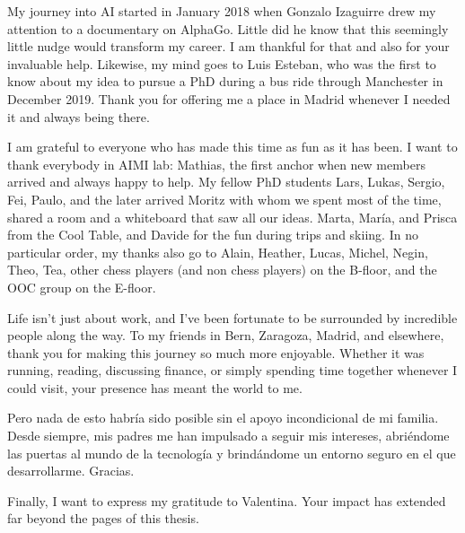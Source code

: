 My journey into AI started in January 2018 when Gonzalo Izaguirre drew my attention to a documentary on AlphaGo. Little did he know that this seemingly little nudge would transform my career. I am thankful for that and also for your invaluable help. Likewise, my mind goes to Luis Esteban, who was the first to know about my idea to pursue a PhD during a bus ride through Manchester in December 2019. Thank you for offering me a place in Madrid whenever I needed it and always being there.

I am grateful to everyone who has made this time as fun as it has been. I want to thank everybody in AIMI lab: Mathias, the first anchor when new members arrived and always happy to help. My fellow PhD students Lars, Lukas, Sergio, Fei, Paulo, and the later arrived Moritz with whom we spent most of the time, shared a room and a whiteboard that saw all our ideas. Marta, María, and Prisca from the Cool Table, and Davide for the fun during trips and skiing. In no particular order, my thanks also go to Alain, Heather, Lucas, Michel, Negin, Theo, Tea, other chess players (and non chess players) on the B-floor, and the OOC group on the E-floor.

Life isn’t just about work, and I’ve been fortunate to be surrounded by incredible people along the way. To my friends in Bern, Zaragoza, Madrid, and elsewhere, thank you for making this journey so much more enjoyable. Whether it was running, reading, discussing finance, or simply spending time together whenever I could visit, your presence has meant the world to me.

Pero nada de esto habría sido posible sin el apoyo incondicional de mi familia. Desde siempre, mis padres me han impulsado a seguir mis intereses, abriéndome las puertas al mundo de la tecnología y brindándome un entorno seguro en el que desarrollarme. Gracias. 

Finally, I want to express my gratitude to Valentina. Your impact has extended far beyond the pages of this thesis.
